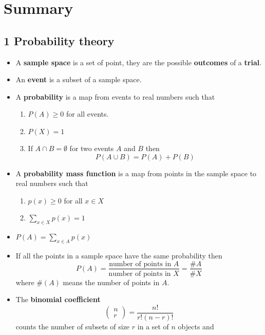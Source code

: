 
\ifind
\section*{Summary}
\else
\subsection*{1 Probability theory}
\fi

\begin{itemize}
\item A \textbf{sample space} is a set of point, they are the possible \textbf{outcomes} of a \textbf{trial}.
\item An \textbf{event} is a subset of a sample space.
\item A \textbf{probability} is a map from events to real numbers such that
  \begin{enumerate}
    \item $P(A)\ge 0$ for all events.
    \item $P(X)=1$
    \item If $A\cap B=\emptyset$ for two events $A$ and $B$ then 
      \begin{equation}
        P(A\cup B)=P(A)+P(B)
      \end{equation}
\end{enumerate}
\item A \textbf{probability mass function} is a map from points in the sample space to real numbers such that
  \begin{enumerate}
\item $p(x)\ge 0$ for all $x\in X$
\item $\sum_{x\in X} p(x)=1$
  \end{enumerate}
\item $P(A)=\sum_{x\in A}p(x)$
\item If all the points in a sample space have the same probability then
  \begin{equation}
P(A)=\frac{\mbox{number of points in }A}{\mbox{number of points in }X}=\frac{\#A}{\#{X}}
  \end{equation}
  where $\#(A)$ means the number of points in $A$.
  \item The \textbf{binomial coefficient}
\begin{equation}
\left(\begin{array}{c}n\\r\end{array}\right)=\frac{n!}{r!(n-r)!}
\end{equation}
counts the number of subsets of size $r$ in a set of $n$ objects and 

\end{itemize}
